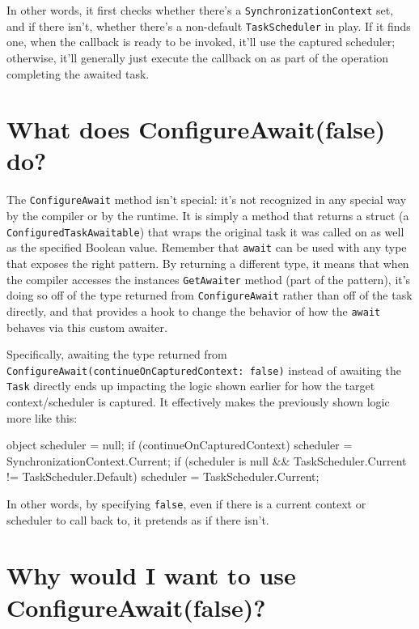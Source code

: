 \documentclass[a4paper,12pt,notitlepage,twoside,openright]{article}
\begin{document}
In other words, it first checks whether there's a
\texttt{SynchronizationContext} set, and if there isn't, whether there's
a non-default \texttt{TaskScheduler} in play. If it finds one, when the
callback is ready to be invoked, it'll use the captured scheduler;
otherwise, it'll generally just execute the callback on as part of the
operation completing the awaited task.

\hypertarget{what-does-configureawaitfalse-do}{%
\section{What does ConfigureAwait(false)
do?}\label{what-does-configureawaitfalse-do}}

The \texttt{ConfigureAwait} method isn't special: it's not recognized in
any special way by the compiler or by the runtime. It is simply a method
that returns a struct (a \texttt{ConfiguredTaskAwaitable}) that wraps
the original task it was called on as well as the specified Boolean
value. Remember that \texttt{await} can be used with any type that
exposes the right pattern. By returning a different type, it means that
when the compiler accesses the instances \texttt{GetAwaiter} method
(part of the pattern), it's doing so off of the type returned from
\texttt{ConfigureAwait} rather than off of the task directly, and that
provides a hook to change the behavior of how the \texttt{await} behaves
via this custom awaiter.

Specifically, awaiting the type returned from
\texttt{ConfigureAwait(continueOnCapturedContext:\ false)} instead of
awaiting the \texttt{Task} directly ends up impacting the logic shown
earlier for how the target context/scheduler is captured. It effectively
makes the previously shown logic more like this:

\begin{csharpcode}
object scheduler = null;
if (continueOnCapturedContext)
{
    scheduler = SynchronizationContext.Current;
    if (scheduler is null && TaskScheduler.Current != TaskScheduler.Default)
    {
        scheduler = TaskScheduler.Current;
    }
}
\end{csharpcode}

In other words, by specifying \texttt{false}, even if there is a current
context or scheduler to call back to, it pretends as if there isn't.

\hypertarget{why-would-i-want-to-use-configureawaitfalse}{%
\section{Why would I want to use
ConfigureAwait(false)?}\label{why-would-i-want-to-use-configureawaitfalse}}
\end{document}
